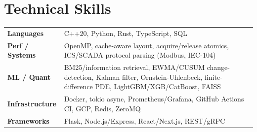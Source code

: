 \documentclass[10pt]{article}
\begin{document}
\section*{Technical Skills}
\noindent
\begin{tabular}{@{}p{2.7cm}p{15.5cm}@{}}
\textbf{Languages} & C++20, Python, Rust, TypeScript, SQL \\
\textbf{Perf / Systems} & OpenMP, cache-aware layout, acquire/release atomics, ICS/SCADA protocol parsing (Modbus, IEC-104) \\
\textbf{ML / Quant} & BM25/information retrieval, EWMA/CUSUM change-detection, Kalman filter, Ornstein-Uhlenbeck, finite-difference PDE, LightGBM/XGB/CatBoost, FAISS \\
\textbf{Infrastructure} & Docker, tokio async, Prometheus/Grafana, GitHub Actions CI, GCP, Redis, ZeroMQ \\
\textbf{Frameworks} & Flask, Node.js/Express, React/Next.js, REST/gRPC \\
\end{tabular}
\end{document}
